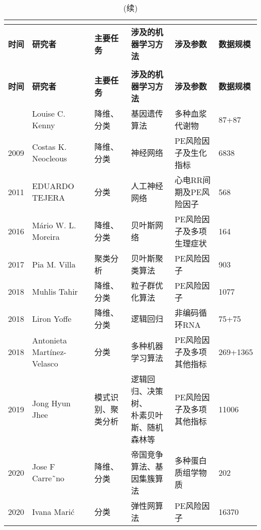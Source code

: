 \begin{landscape}
	\begin{longtable}{m{1cm}<{\centering}m{4cm}<{\centering}m{3cm}<{\centering}m{5.5cm}<{\centering}m{5.5cm}<{\centering}m{2cm}<{\centering}}
		\caption[使用ML技术进行PE相关问题的多项研究小结]{使用ML技术进行PE相关问题的多项研究小结}\\
		\label{tab:AIinPE}\\
		\toprule
        \textbf{时间}&\textbf{研究者}&\textbf{主要任务}&\textbf{涉及的机器学习方法}&\textbf{涉及参数}&\textbf{数据规模}\\
        \midrule
        \endfirsthead
        \caption[]{(续)}\\
        \midrule
        \textbf{时间}&\textbf{研究者}&\textbf{主要任务}&\textbf{涉及的机器学习方法}&\textbf{涉及参数}&\textbf{数据规模}\\
        \midrule
        \endhead 
        \midrule
        \endfoot
        \bottomrule
        \endlastfoot
        2005&Louise C. Kenny\cite{Kenny2005}&降维、分类&基因遗传算法&多种血浆代谢物&87+87\\
        2009&Costas K. Neocleous\cite{Neocleous2009}&降维、分类&神经网络&PE风险因子及生化指标&6838\\
        \cellcolor{cyan}2011&\cellcolor{cyan}EDUARDO TEJERA\cite{Tejera2011}&\cellcolor{cyan}分类&\cellcolor{cyan}人工神经网络&\cellcolor{cyan}心电RR间期及PE风险因子&\cellcolor{cyan}568\\
        2016&Mário W. L. Moreira\cite{Moreira2016}&降维、分类&贝叶斯网络&PE风险因子及多项生理症状&164\\
        2017&Pia M. Villa\cite{Villa2017}&聚类分析&贝叶斯聚类算法&PE风险因子&903\\
        2018&Muhlis Tahir\cite{Tahir2018,Tahir2018-2}&降维、分类&粒子群优化算法&PE风险因子&1077\\
        2018&Liron Yoffe\cite{Yoffe2018}&降维、分类&逻辑回归&非编码循环RNA&75+75\\
        2018&Antonieta Martínez-Velasco\cite{Martinez2018}&分类&多种机器学习算法&PE风险因子及多项其他指标&269+1365\\
        2019&Jong Hyun Jhee\cite{Jhee2019}&模式识别、聚类分析&\tabincell{c}{逻辑回归、决策树、\\朴素贝叶斯、随机森林等}&PE风险因子及多项其他指标&11006\\
        2020&Jose F Carre˜no\cite{Carreno2020}&降维、分类&帝国竞争算法、基因集簇算法&多种蛋白质组学物质&202\\
        2020&Ivana Mari{\'{c}}\cite{Maric2020}&分类&弹性网算法&PE风险因子&16370\\

\end{longtable}
\end{landscape}

